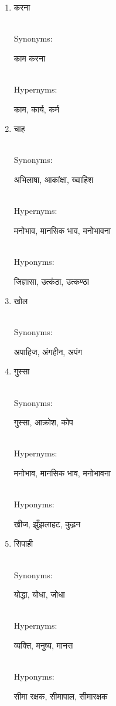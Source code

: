\documentclass{article}
\begin{document}
\begin{enumerate}
\item \begin{hindi}करना\end{hindi} \\
Synonyms: \begin{hindi}काम करना\end{hindi} \\
Hypernyms: \begin{hindi}काम, कार्य, कर्म\end{hindi}

\item \begin{hindi}चाह\end{hindi} \\
Synonyms: \begin{hindi}अभिलाषा, आकांक्षा, ख्वाहिश\end{hindi} \\
Hypernyms: \begin{hindi}मनोभाव, मानसिक भाव, मनोभावना\end{hindi} \\
Hyponyms: \begin{hindi}जिज्ञासा, उत्कंठा, उत्कण्ठा\end{hindi}

\item \begin{hindi}खोल\end{hindi} \\
Synonyms: \begin{hindi}अपाहिज, अंगहीन, अपंग\end{hindi}

\item \begin{hindi}गुस्सा\end{hindi} \\
Synonyms: \begin{hindi}गुस्सा, आक्रोश, कोप\end{hindi} \\
Hypernyms: \begin{hindi}मनोभाव, मानसिक भाव, मनोभावना\end{hindi} \\
Hyponyms: \begin{hindi}खीज, झुँझलाहट, कुढ़न\end{hindi}

\item \begin{hindi}सिपाही\end{hindi} \\
Synonyms: \begin{hindi}योद्धा, योधा, जोधा\end{hindi} \\
Hypernyms: \begin{hindi}व्यक्ति, मनुष्य, मानस\end{hindi} \\
Hyponyms: \begin{hindi}सीमा रक्षक, सीमापाल, सीमारक्षक\end{hindi}


\end{enumerate}
\end{document}
